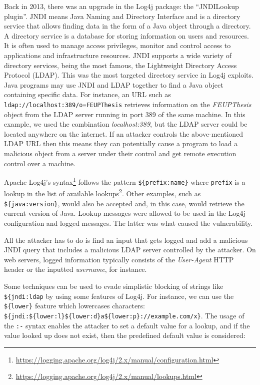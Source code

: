 Back in 2013, there was an upgrade in the Log4j package: the ``JNDILookup plugin''. JNDI means Java Naming and Directory Interface and is a directory service that allows finding data in the form of a Java object through a directory. A directory service is a database for storing information on users and resources. It is often used to manage access privileges, monitor and control access to applications and infrastructure resources. JNDI supports a wide variety of directory services, being the most famous, the Lightweight Directory Access Protocol (LDAP). This was the most targeted directory service in Log4j exploits. Java programs may use JNDI and LDAP together to find a Java object containing specific data. For instance, an URL such as \texttt{ldap://localhost:389/o=FEUPThesis} retrieves information on the \textit{FEUPThesis} object from the LDAP server running in port 389 of the same machine. In this example, we used the combination \textit{localhost:389}, but the LDAP server could be located anywhere on the internet. If an attacker controls the above-mentioned LDAP URL then this means they can potentially cause a program to load a malicious object from a server under their control and get remote execution control over a machine.

Apache Log4j's syntax\footnote{\url{https://logging.apache.org/log4j/2.x/manual/configuration.html}} follows the pattern \texttt{\$\{prefix:name\}} where \texttt{prefix} is a lookup in the list of available lookups\footnote{\url{https://logging.apache.org/log4j/2.x/manual/lookups.html}}. Other examples, such as \texttt{\$\{java:version\}}, would also be accepted and, in this case, would retrieve the current version of Java. Lookup messages were allowed to be used in the Log4j configuration and logged messages. The latter was what caused the vulnerability.

All the attacker has to do is find an input that gets logged and add a malicious JNDI query that includes a malicious LDAP server controlled by the attacker. On web servers, logged information typically consists of the \textit{User-Agent} HTTP header or the inputted \textit{username}, for instance.

Some techniques can be used to evade simplistic blocking of strings like \texttt{\$\{jndi:ldap} by using some features of Log4j. For instance, we can use the \texttt{\$\{lower\}} feature which lowercases characters: \texttt{\$\{jndi:\$\{lower:l\}\$\{lower:d\}a\$\{lower:p\}://example.com/x\}}. The usage of the \texttt{:-} syntax enables the attacker to set a default value for a lookup, and if the value looked up does not exist, then the predefined default value is considered:

